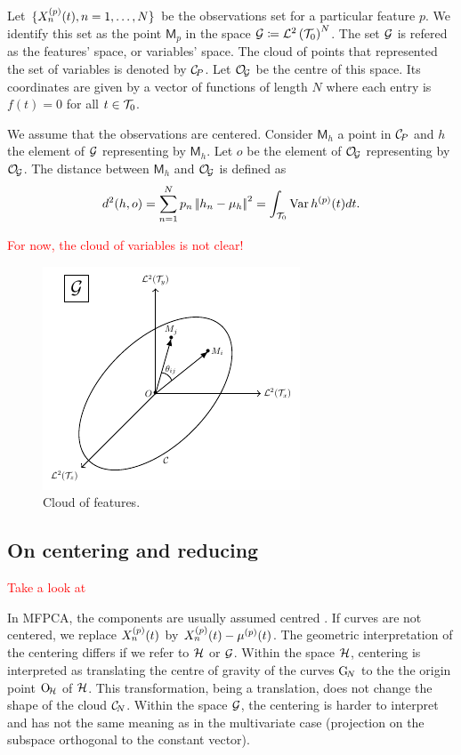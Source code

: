 Let $\{X_n^{(p)}(t), n = 1, \dots, N\}$ be the observations set for a particular feature $p$. We identify this set as the point $\mathsf{M}_p$ in the space $\mathcal{G} \coloneqq \mathcal{L}^{2}\left(\mathcal{T}_{0}\right)^N$. The set $\mathcal{G}$ is refered as the features' space, or variables' space. The cloud of points that represented the set of variables is denoted by $\mathcal{C}_{\!P}$. Let $\mathcal{O}_{\!\mathcal{G}}$ be the centre of this space. Its coordinates are given by a vector of functions of length $N$ where each entry is $f(t) = 0$ for all $t \in \mathcal{T}_{0}$.

We assume that the observations are centered. Consider $\mathsf{M}_h$ a point in $\mathcal{C}_{\!P}$ and $h$ the element of $\mathcal{G}$ representing by $\mathsf{M}_h$. Let $o$ be the element of $\mathcal{O}_{\!\mathcal{G}}$ representing by $\mathcal{O}_{\!\mathcal{G}}$. The distance between $\mathsf{M}_h$ and $\mathcal{O}_{\!\mathcal{G}}$ is defined as
\begin{equation*}
d^2(h, o) = \sum_{n = 1}^N p_n \left|\!\left|h_n - \mu_h\right|\!\right|^2 = \int_{\mathcal{T}_{0}} \operatorname{Var} h^{(p)}(t)dt.
\end{equation*} 

\textcolor{red}{For now, the cloud of variables is not clear!}

\begin{figure}
    \centering
    \includegraphics[scale=1.2]{figures/cloud_features.pdf}
    \caption{Cloud of features.}
    \label{fig:cloud_features}
\end{figure}

\subsection{On centering and reducing} %
\label{sub:on_centering_and_reducing}

\textcolor{red}{Take a look at \cite{protheroNewPerspectivesCentering2021}}

In MFPCA, the components are usually assumed centred \cite{happMultivariateFunctionalPrincipal2015}. If curves are not centered, we replace $X_n^{(p)}(t)$ by $X_n^{(p)}(t) - \mu^{(p)}(t)$. The geometric interpretation of the centering differs if we refer to $\mathcal{H}$ or $\mathcal{G}$. Within the space $\mathcal{H}$, centering is interpreted as translating the centre of gravity of the curves $\mathrm{G}_{\!N}$ to the the origin point $\mathrm{O}_{\!\mathcal{H}}$ of $\mathcal{H}$. This transformation, being a translation, does not change the shape of the cloud $\mathcal{C}_{\!N}$. Within the space $\mathcal{G}$, the centering is harder to interpret and has not the same meaning as in the multivariate case (projection on the subspace orthogonal to the constant vector). 

